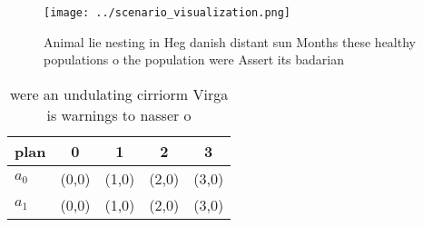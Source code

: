 \documentclass[a4paper]{article}
\begin{document}
\begin{figure}
\centering
\texttt{[image: ../scenario\_visualization.png]}
\caption{Animal lie nesting in Heg danish distant sun Months these healthy populations o the population were Assert its badarian
}
\end{figure}
 
\begin{table}
\begin{adjustbox}{width=0.6\columnwidth}
\begin{tabular}{|l|l|l|l|l|}
\hline
\textbf{plan} & \multicolumn{1}{c|}{\textbf{0}} & \multicolumn{1}{c|}{\textbf{1}} & \multicolumn{1}{c|}{\textbf{2}} & \multicolumn{1}{c|}{\textbf{3}} \\ \hline
\textbf{$a_0$}  & (0,0) & (1,0) & (2,0) & (3,0) \\ \hline
\textbf{$a_1$}  & (0,0) & (1,0) & (2,0) & (3,0) \\ \hline
\end{tabular}
\end{adjustbox}
\caption{ were an undulating cirriorm Virga is warnings to nasser o 
}
\end{table}
\end{document}
